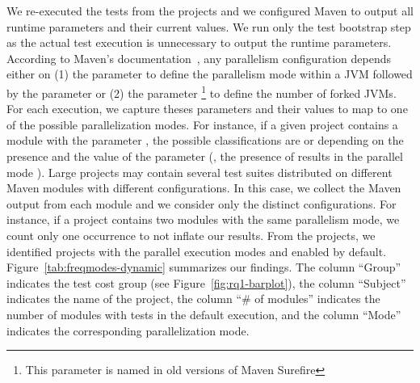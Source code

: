 We re-executed the tests from the \numMedLong{} projects and we
configured Maven to output all runtime parameters and their current
values. We run only the test bootstrap step as the actual test
execution is unnecessary to output the runtime parameters.
According to Maven's documentation~\cite{maven-surefire-plugin}, any
parallelism configuration depends either on (1) the parameter
 to define the parallelism mode within a JVM followed
by the parameter  or (2) the parameter
\footnote{This parameter is named 
in old versions of Maven Surefire} to define the number of forked
JVMs. For each execution, we capture theses parameters and their
values to map to one of the possible parallelization modes.  For
instance, if a given project contains a module with the parameter
, the possible classifications are
\ForkSeq{} or \ForkParMeth{} depending on the presence and the value
of the parameter  (\ie, the presence of
 results in the parallel mode
\ForkParMeth{}).
Large projects may contain several test suites distributed on
different Maven modules with different configurations. In this case,
we collect the Maven output from each module and we consider only the
distinct configurations. For instance, if a project contains two
modules with the same parallelism mode, we count only one occurrence
to not inflate our results.
From the \numMedLong{} projects, we identified \numProjectsPar{}
projects with the parallel execution modes \ForkSeq{} and
\ParClassParMeth{} enabled by default.
Figure~\ref{tab:freqmodes-dynamic} summarizes our findings. The column
``Group'' indicates the test cost group (see
Figure~\ref{fig:rq1-barplot}), the column ``Subject'' indicates the
name of the project, the column ``\# of modules'' indicates the number
of modules with tests in the default execution, and the column
``Mode'' indicates the corresponding parallelization mode.
